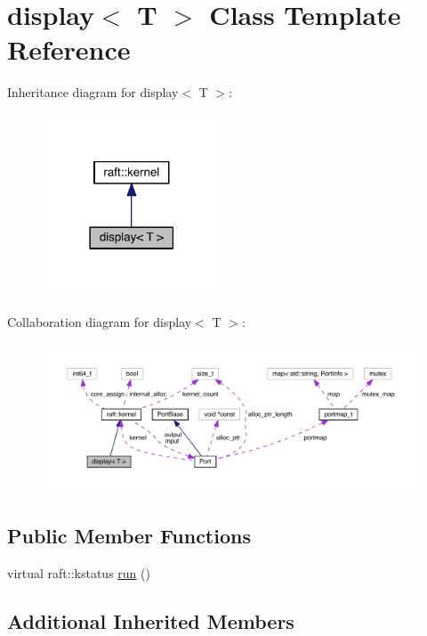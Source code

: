 \hypertarget{classdisplay}{}\section{display$<$ T $>$ Class Template Reference}
\label{classdisplay}


Inheritance diagram for display$<$ T $>$\+:
\nopagebreak
\begin{figure}[H]
\begin{center}
\leavevmode
\includegraphics[width=150pt]{classdisplay__inherit__graph}
\end{center}
\end{figure}


Collaboration diagram for display$<$ T $>$\+:
\nopagebreak
\begin{figure}[H]
\begin{center}
\leavevmode
\includegraphics[width=350pt]{classdisplay__coll__graph}
\end{center}
\end{figure}
\subsection*{Public Member Functions}
\begin{DoxyCompactItemize}
\item 
virtual raft\+::kstatus \hyperlink{classdisplay_a8652ca329ee5d1650e183b17f7299b51}{run} ()
\end{DoxyCompactItemize}
\subsection*{Additional Inherited Members}


